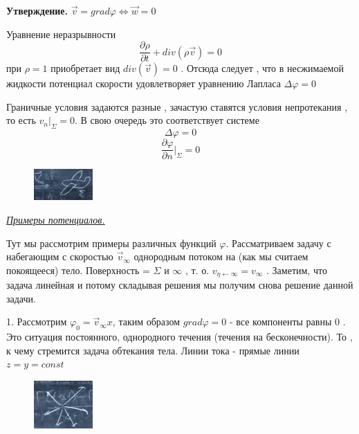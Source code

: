\textbf{Утверждение.} $\overrightarrow{v} = grad \varphi \Leftrightarrow \overrightarrow{w} = 0$

\newpage
Уравнение неразрывности 
$$
\frac{\partial \rho}{\partial t} + div(\rho \overrightarrow{v}) = 0
$$
при $\rho = 1$  приобретает вид $div( \overrightarrow{v}) = 0 $ . Отсюда следует , что в несжимаемой жидкости потенциал скорости удовлетворяет уравнению Лапласа $\Delta \varphi = 0$

Граничные условия задаются разные , зачастую ставятся условия непротекания , то есть $v_n |_{\Sigma} = 0$. В свою очередь это соответствует системе 
$$
\Delta \varphi = 0
$$
$$
\frac{\partial \varphi}{\partial n} |_{\Sigma} = 0
$$

\begin{figure}
	\includegraphics[width=0.2\textwidth]{14/pic_1.png}
	\caption{\label{ris:image14.1}}
\end{figure}

\begin{center}
	\textit{\underline{Примеры потенциалов.}}
\end{center}

Тут мы рассмотрим примеры различных функций $\varphi $. Рассматриваем задачу с набегающим с скоростью $\overrightarrow{v}_{\infty}$ однородным потоком на (как мы считаем покоящееся) тело.  Поверхность = $\Sigma$ и $\infty$  , т. о. $v_{\eta \leftarrow \infty} = v_\infty$ . Заметим, что задача линейная и потому складывая решения мы получим снова решение данной задачи.

1. Рассмотрим $\varphi_0 = \overrightarrow{v}_{\infty} x$, таким образом $grad \varphi = 0$ - все компоненты равны 0 . Это ситуация постоянного, однородного течения (течения на бесконечности). То , к чему стремится задача обтекания тела. Линии тока - прямые линии $z=y=const$

\begin{figure}
	\includegraphics[width=0.2\textwidth]{14/pic_2.png}
	\caption{\label{ris:image14.2}}
\end{figure}

